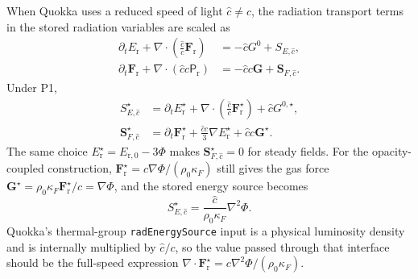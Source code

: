 \documentclass[11pt]{article}
\newcommand{\Div}{\nabla\!\cdot}
\newcommand{\Grad}{\nabla}
\newcommand{\Er}{E_{\mathrm r}}
\newcommand{\Fr}{\bm{F}_{\mathrm r}}
\newcommand{\Prad}{\mathsf{P}_{\mathrm r}}
\newcommand{\Gmom}{\bm{G}}
\newcommand{\Gzero}{G^0}
\newcommand{\chat}{\hat{c}}
\newcommand{\Erzero}{E_{\mathrm r,0}}
\newcommand{\SErsla}{S_{E,\hat{c}}}
\newcommand{\SFrsla}{\bm{S}_{F,\hat{c}}}
\begin{document}
When Quokka uses a reduced speed of light \(\chat\ne c\), the radiation
transport terms in the stored radiation variables are scaled as
\begin{align}
  \partial_t\Er + \Div\left(\frac{\chat}{c}\Fr\right)
  &= -\chat\Gzero + \SErsla,
  \label{eq:rsla-energy}\\
  \partial_t\Fr + \Div(\chat c\Prad)
  &= -\chat c\Gmom + \SFrsla.
  \label{eq:rsla-flux}
\end{align}
Under P1,
\begin{align}
  \SErsla^\star
  &=
  \partial_t\Er^\star
  + \Div\left(\frac{\chat}{c}\Fr^\star\right)
  + \chat G^{0,\star},
  \label{eq:rsla-energy-source}\\
  \SFrsla^\star
  &=
  \partial_t\Fr^\star
  + \frac{\chat c}{3}\Grad\Er^\star
  + \chat c\Gmom^\star.
  \label{eq:rsla-flux-source}
\end{align}
The same choice \(\Er^\star=\Erzero-3\Phi\) makes
\(\SFrsla^\star=0\) for steady fields.  For the opacity-coupled
construction, \(\Fr^\star=c\Grad\Phi/(\rho_0\kappa_F)\) still gives the gas
force \(\Gmom^\star=\rho_0\kappa_F\Fr^\star/c=\Grad\Phi\), and the stored
energy source becomes
\begin{equation}
  \SErsla^\star
  =
  \frac{\chat}{\rho_0\kappa_F}\nabla^2\Phi.
  \label{eq:rsla-energy-source-final}
\end{equation}
Quokka's thermal-group \texttt{radEnergySource} input is a physical luminosity
density and is internally multiplied by \(\chat/c\), so the value passed
through that interface should be the full-speed expression
\(\Div\Fr^\star=c\nabla^2\Phi/(\rho_0\kappa_F)\).
\end{document}

